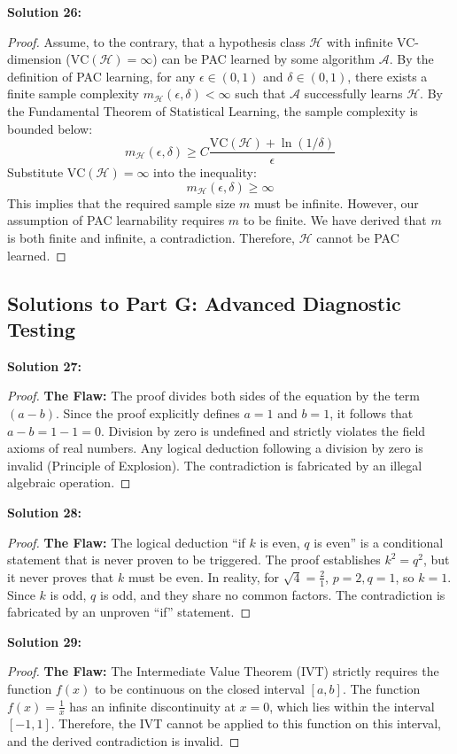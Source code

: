 \documentclass[11pt]{article}
\theoremstyle{definition}
\begin{document}
\textbf{Solution 26:}
\begin{proof}
Assume, to the contrary, that a hypothesis class $\mathcal{H}$ with infinite VC-dimension ($\text{VC}(\mathcal{H}) = \infty$) can be PAC learned by some algorithm $\mathcal{A}$. By the definition of PAC learning, for any $\epsilon \in (0, 1)$ and $\delta \in (0, 1)$, there exists a finite sample complexity $m_{\mathcal{H}}(\epsilon, \delta) < \infty$ such that $\mathcal{A}$ successfully learns $\mathcal{H}$.
By the Fundamental Theorem of Statistical Learning, the sample complexity is bounded below:
\[ m_{\mathcal{H}}(\epsilon, \delta) \ge C \frac{\text{VC}(\mathcal{H}) + \ln(1/\delta)}{\epsilon} \]
Substitute $\text{VC}(\mathcal{H}) = \infty$ into the inequality:
\[ m_{\mathcal{H}}(\epsilon, \delta) \ge \infty \]
This implies that the required sample size $m$ must be infinite. However, our assumption of PAC learnability requires $m$ to be finite. We have derived that $m$ is both finite and infinite, a contradiction. Therefore, $\mathcal{H}$ cannot be PAC learned.
\end{proof}

\subsection*{Solutions to Part G: Advanced Diagnostic Testing}

\textbf{Solution 27:}
\begin{proof}
\textbf{The Flaw:} The proof divides both sides of the equation by the term $(a - b)$. Since the proof explicitly defines $a = 1$ and $b = 1$, it follows that $a - b = 1 - 1 = 0$. Division by zero is undefined and strictly violates the field axioms of real numbers. Any logical deduction following a division by zero is invalid (Principle of Explosion). The contradiction is fabricated by an illegal algebraic operation.
\end{proof}

\textbf{Solution 28:}
\begin{proof}
\textbf{The Flaw:} The logical deduction ``if $k$ is even, $q$ is even'' is a conditional statement that is never proven to be triggered. The proof establishes $k^2 = q^2$, but it never proves that $k$ must be even. In reality, for $\sqrt{4} = \frac{2}{1}$, $p = 2, q = 1$, so $k = 1$. Since $k$ is odd, $q$ is odd, and they share no common factors. The contradiction is fabricated by an unproven ``if'' statement.
\end{proof}

\textbf{Solution 29:}
\begin{proof}
\textbf{The Flaw:} The Intermediate Value Theorem (IVT) strictly requires the function $f(x)$ to be continuous on the closed interval $[a, b]$. The function $f(x) = \frac{1}{x}$ has an infinite discontinuity at $x = 0$, which lies within the interval $[-1, 1]$. Therefore, the IVT cannot be applied to this function on this interval, and the derived contradiction is invalid.
\end{proof}
\end{document}
